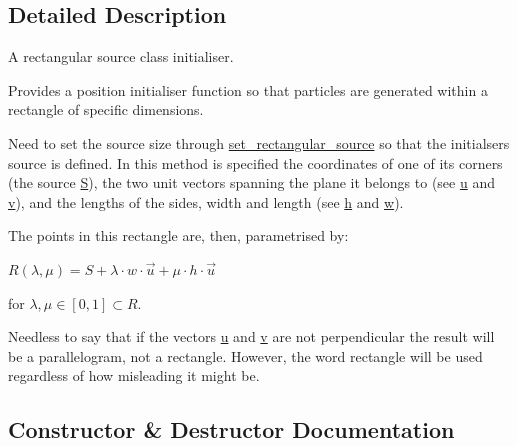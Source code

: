 \subsection{Detailed Description}
A rectangular source class initialiser. 

Provides a position initialiser function so that particles are generated within a rectangle of specific dimensions.

Need to set the source size through \hyperlink{classphysim_1_1init_1_1rect__source_a6f398085d0f0391b2acf91cebd5b97c1}{set\+\_\+rectangular\+\_\+source} so that the initialser\textquotesingle{}s source is defined. In this method is specified the coordinates of one of its corners (the source \hyperlink{classphysim_1_1init_1_1rect__source_ab12449975c6df03027ff17b424fb151b}{S}), the two unit vectors spanning the plane it belongs to (see \hyperlink{classphysim_1_1init_1_1rect__source_ab46280374968757bd185cb9053020371}{u} and \hyperlink{classphysim_1_1init_1_1rect__source_a3373fe0fda8e01ba6680bde903b371b1}{v}), and the lengths of the sides, width and length (see \hyperlink{classphysim_1_1init_1_1rect__source_a9ada91327596758bd9e1d5053db0ff73}{h} and \hyperlink{classphysim_1_1init_1_1rect__source_a4a7f1402b417e2217ab3724e6e55c18b}{w}).

The points in this rectangle are, then, parametrised by\+:

$R(\lambda, \mu) = S + \lambda\cdot w\cdot \vec{u} + \mu\cdot h\cdot \vec{u}$

for $\lambda,\mu \in [0,1]\subset R$.

Needless to say that if the vectors \hyperlink{classphysim_1_1init_1_1rect__source_ab46280374968757bd185cb9053020371}{u} and \hyperlink{classphysim_1_1init_1_1rect__source_a3373fe0fda8e01ba6680bde903b371b1}{v} are not perpendicular the result will be a parallelogram, not a rectangle. However, the word \textquotesingle{}rectangle\textquotesingle{} will be used regardless of how misleading it might be. 

\subsection{Constructor \& Destructor Documentation}
\mbox{\label{classphysim_1_1init_1_1rect__source_a0a8b0a776a1aba007a620ce7bd5033dc}} 
